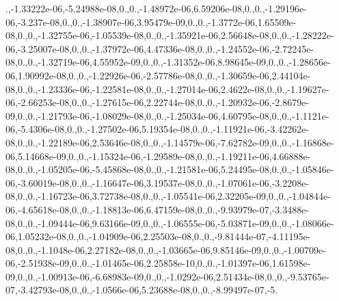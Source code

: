 \begin{DoxyCompactItemize}
.,-\/1.\-33222e-\/06,-\/5.\-24988e-\/08,0.,0.,-\/1.\-48972e-\/06,6.\-59206e-\/08,0.,0.,-\/1.\-29196e-\/06,-\/3.\-237e-\/08,0.,0.,-\/1.\-38907e-\/06,3.\-95479e-\/09,0.,0.,-\/1.\-3772e-\/06,1.\-65509e-\/08,0.,0.,-\/1.\-32755e-\/06,-\/1.\-05539e-\/08,0.,0.,-\/1.\-35921e-\/06,2.\-56648e-\/08,0.,0.,-\/1.\-28222e-\/06,-\/3.\-25007e-\/08,0.,0.,-\/1.\-37972e-\/06,4.\-47336e-\/08,0.,0.,-\/1.\-24552e-\/06,-\/2.\-72245e-\/08,0.,0.,-\/1.\-32719e-\/06,4.\-55952e-\/09,0.,0.,-\/1.\-31352e-\/06,8.\-98645e-\/09,0.,0.,-\/1.\-28656e-\/06,1.\-90992e-\/08,0.,0.,-\/1.\-22926e-\/06,-\/2.\-57786e-\/08,0.,0.,-\/1.\-30659e-\/06,2.\-44104e-\/08,0.,0.,-\/1.\-23336e-\/06,-\/1.\-22581e-\/08,0.,0.,-\/1.\-27014e-\/06,2.\-4622e-\/08,0.,0.,-\/1.\-19627e-\/06,-\/2.\-66253e-\/08,0.,0.,-\/1.\-27615e-\/06,2.\-22744e-\/08,0.,0.,-\/1.\-20932e-\/06,-\/2.\-8679e-\/09,0.,0.,-\/1.\-21793e-\/06,-\/1.\-08029e-\/08,0.,0.,-\/1.\-25034e-\/06,4.\-60795e-\/08,0.,0.,-\/1.\-1121e-\/06,-\/5.\-4306e-\/08,0.,0.,-\/1.\-27502e-\/06,5.\-19354e-\/08,0.,0.,-\/1.\-11921e-\/06,-\/3.\-42262e-\/08,0.,0.,-\/1.\-22189e-\/06,2.\-53646e-\/08,0.,0.,-\/1.\-14579e-\/06,-\/7.\-62782e-\/09,0.,0.,-\/1.\-16868e-\/06,5.\-14668e-\/09,0.,0.,-\/1.\-15324e-\/06,-\/1.\-29589e-\/08,0.,0.,-\/1.\-19211e-\/06,4.\-66888e-\/08,0.,0.,-\/1.\-05205e-\/06,-\/5.\-45868e-\/08,0.,0.,-\/1.\-21581e-\/06,5.\-24495e-\/08,0.,0.,-\/1.\-05846e-\/06,-\/3.\-60019e-\/08,0.,0.,-\/1.\-16647e-\/06,3.\-19537e-\/08,0.,0.,-\/1.\-07061e-\/06,-\/3.\-2208e-\/08,0.,0.,-\/1.\-16723e-\/06,3.\-72738e-\/08,0.,0.,-\/1.\-05541e-\/06,2.\-32205e-\/09,0.,0.,-\/1.\-04844e-\/06,-\/4.\-65618e-\/08,0.,0.,-\/1.\-18813e-\/06,6.\-47159e-\/08,0.,0.,-\/9.\-93979e-\/07,-\/3.\-3488e-\/08,0.,0.,-\/1.\-09444e-\/06,9.\-63166e-\/09,0.,0.,-\/1.\-06555e-\/06,-\/5.\-03871e-\/09,0.,0.,-\/1.\-08066e-\/06,1.\-05232e-\/08,0.,0.,-\/1.\-04909e-\/06,2.\-25503e-\/08,0.,0.,-\/9.\-81444e-\/07,-\/4.\-11195e-\/08,0.,0.,-\/1.\-1048e-\/06,2.\-27182e-\/08,0.,0.,-\/1.\-03665e-\/06,9.\-85146e-\/09,0.,0.,-\/1.\-00709e-\/06,-\/2.\-51938e-\/09,0.,0.,-\/1.\-01465e-\/06,2.\-25858e-\/10,0.,0.,-\/1.\-01397e-\/06,1.\-61598e-\/09,0.,0.,-\/1.\-00913e-\/06,-\/6.\-68983e-\/09,0.,0.,-\/1.\-0292e-\/06,2.\-51434e-\/08,0.,0.,-\/9.\-53765e-\/07,-\/3.\-42793e-\/08,0.,0.,-\/1.\-0566e-\/06,5.\-23688e-\/08,0.,0.,-\/8.\-99497e-\/07,-\/5.
\end{DoxyCompactItemize}
